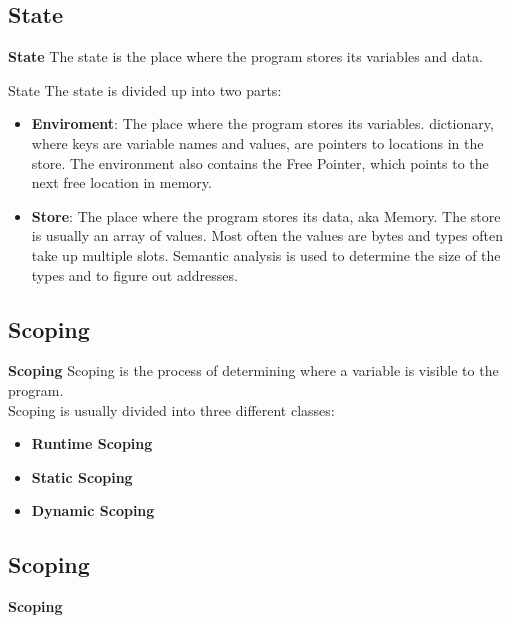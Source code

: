 
\subsection{State}
\begin{frame}{\textbf{State}}
    The state is the place where the program stores its variables and data.
    \begin{block}{State}
        The state is divided up into two parts:
        \begin{itemize}
            \item \textbf{Enviroment}: The place where the program stores its variables.
                                        dictionary, where keys are variable names and values, are pointers to locations in the store. 
                                        The environment also contains the Free Pointer, which points to the next free location in memory.
            \item \textbf{Store}: The place where the program stores its data, aka Memory.
                                    The store is usually an array of values. Most often the values are bytes and types often take up multiple slots.
                                    Semantic analysis is used to determine the size of the types and to figure out addresses.
        \end{itemize}
    \end{block}
\end{frame}

\subsection{Scoping}
\begin{frame}{\textbf{Scoping}}
    Scoping is the process of determining where a variable is visible to the program.\\
    Scoping is usually divided into three different classes:
    \begin{itemize}
        \item \textbf{Runtime Scoping}
        \item \textbf{Static Scoping}
        \item \textbf{Dynamic Scoping}
    \end{itemize}
\end{frame}

\subsection*{Scoping}
\begin{frame}[fragile]{\textbf{Scoping}}
    \begin{example}
        
    \end{example}
\end{frame}



